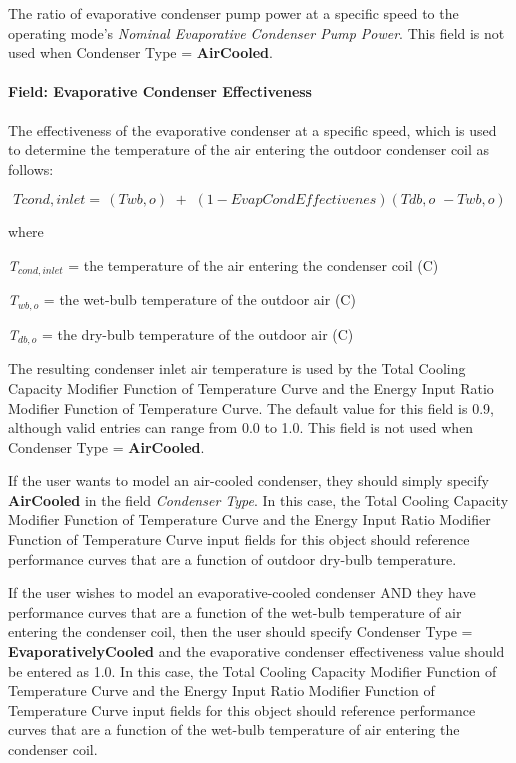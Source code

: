 The ratio of evaporative condenser pump power at a specific speed to the operating mode's \textit{Nominal Evaporative Condenser Pump Power}. This field is not used when Condenser Type = \textbf{AirCooled}.

\paragraph{Field: Evaporative Condenser Effectiveness}\label{field-evaporative-condenser-effectiveness}

The effectiveness of the evaporative condenser at a specific speed, which is used to determine the temperature of the air entering the outdoor condenser coil as follows:

\begin{equation}
Tcond,inlet = \,\left( {Twb,o} \right)\,\, + \,\,\left( {1 - EvapCondEffectivenes} \right)\left( {Tdb,o\,\, - Twb,o} \right)
\end{equation}

where

\emph{T\(_{cond,inlet}\)} = the temperature of the air entering the condenser coil (C)

\emph{T\(_{wb,o}\)} = the wet-bulb temperature of the outdoor air (C)

\emph{T\(_{db,o}\)} = the dry-bulb temperature of the outdoor air (C)

The resulting condenser inlet air temperature is used by the Total Cooling Capacity Modifier Function of Temperature Curve and the Energy Input Ratio Modifier Function of Temperature Curve. The default value for this field is 0.9, although valid entries can range from 0.0 to 1.0. This field is not used when Condenser Type = \textbf{AirCooled}.

If the user wants to model an air-cooled condenser, they should simply specify \textbf{AirCooled} in the field \textit{Condenser Type}. In this case, the Total Cooling Capacity Modifier Function of Temperature Curve and the Energy Input Ratio Modifier Function of Temperature Curve input fields for this object should reference performance curves that are a function of outdoor dry-bulb temperature.

If the user wishes to model an evaporative-cooled condenser AND they have performance curves that are a function of the wet-bulb temperature of air entering the condenser coil, then the user should specify Condenser Type = \textbf{EvaporativelyCooled} and the evaporative condenser effectiveness value should be entered as 1.0. In this case, the Total Cooling Capacity Modifier Function of Temperature Curve and the Energy Input Ratio Modifier Function of Temperature Curve input fields for this object should reference performance curves that are a function of the wet-bulb temperature of air entering the condenser coil.

